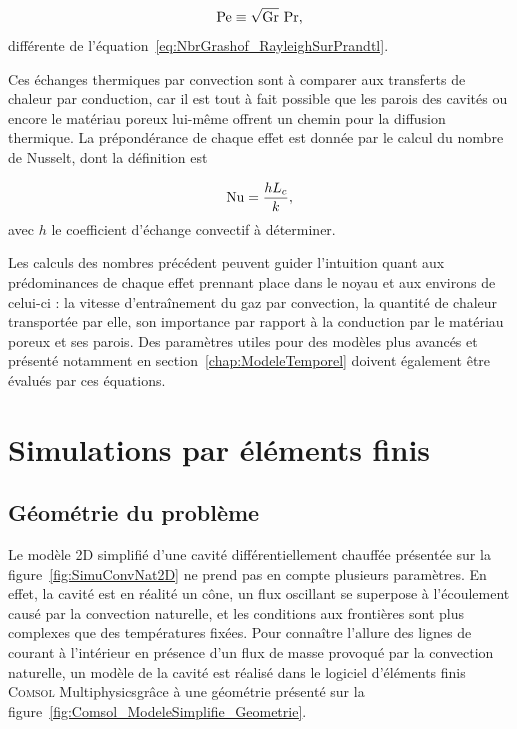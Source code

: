 \begin{equation}
	\mathrm{Pe} \equiv \sqrt{\mathrm{Gr}}~\mathrm{Pr},
	\label{eq:NbrPeclet_GrashofFoisPrandtl}
\end{equation}
différente de l'équation~\eqref{eq:NbrGrashof_RayleighSurPrandtl}.\medskip

Ces échanges thermiques par convection sont à comparer aux transferts de chaleur par conduction, car il est tout à fait possible que les parois des cavités ou encore le matériau poreux lui-même offrent un chemin pour la diffusion thermique. La prépondérance de chaque effet est donnée par le calcul du nombre de Nusselt, dont la définition est

\begin{equation}
	\mathrm{Nu} = \frac{h L_c}{k},
\end{equation}
avec $h$ le coefficient d'échange convectif à déterminer.\bigskip

Les calculs des nombres précédent peuvent guider l'intuition quant aux prédominances de chaque effet prennant place dans le noyau et aux environs de celui-ci : la vitesse d'entraînement du gaz par convection, la quantité de chaleur transportée par elle, son importance par rapport à la conduction par le matériau poreux et ses parois. Des paramètres utiles pour des modèles plus avancés et présenté notamment en section~\ref{chap:ModeleTemporel} doivent également être évalués par ces équations.

\section{Simulations par éléments finis}\label{chap:FEM}
\subsection{Géométrie du problème}
Le modèle 2D simplifié d'une cavité différentiellement chauffée présentée sur la figure~\ref{fig:SimuConvNat2D} ne prend pas en compte plusieurs paramètres. En effet, la cavité est en réalité un cône, un flux oscillant se superpose à l'écoulement causé par la convection naturelle, et les conditions aux frontières sont plus complexes que des températures fixées. Pour connaître l'allure des lignes de courant à l'intérieur en présence d'un flux de masse provoqué par la convection naturelle, un modèle de la cavité est réalisé dans le logiciel d'éléments finis \textsc{Comsol} Multiphysics\textss\textregistered grâce à une géométrie présenté sur la figure~\ref{fig:Comsol_ModeleSimplifie_Geometrie}.

